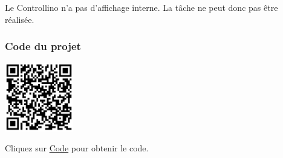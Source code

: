 \documentclass[a4paper,12pt]{report}
\begin{document}
Le Controllino n'a pas d'affichage interne. La tâche ne peut donc pas être réalisée.

\subsubsection{Code du projet}

\begin{minipage}{0.5\textwidth}
    \includegraphics[height=3cm]{Code TC207.png}
\end{minipage}%
\begin{minipage}{0.5\textwidth}
    Cliquez sur \href{https://github.com/DexterTaha/Controllino-PLC-Sample/blob/main/TC200/TC207_Display/TC207_Display.ino}{Code} pour obtenir le code.
\end{minipage}

\newpage
\end{document}
